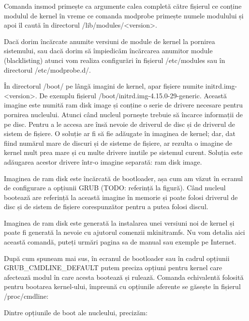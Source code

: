 Comanda insmod primește ca argumente calea completă către fișierul ce conține
modulul de kernel în vreme ce comanda modprobe primește numele modulului și apoi
îl caută în directorul /lib/modules/<version>.

Dacă dorim încărcate anumite versiuni de module de kernel la pornirea
sistemului, sau dacă dorim să împiedicăm încărcarea anumitor module
(blacklisting) atunci vom realiza configurări în fișierul /etc/modules sau în
directorul /etc/modprobe.d/.

În directorul /boot/ pe lângă imagini de kernel, apar fișiere numite
initrd.img-<version>. De exemplu fișierul /boot/initrd.img-4.15.0-29-generic.
Această imagine este numită ram disk image și conține o serie de drivere
necesare pentru pornirea nucleului. Atunci când nucleul pornește trebuie să
încarce informații de pe disc. Pentru a le accesa are însă nevoie de driverul de
disc și de driverul de sistem de fișiere. O soluție ar fi să fie adăugate în
imaginea de kernel; dar, dat fiind numărul mare de discuri și de sisteme de
fișiere, ar rezulta o imagine de kernel mult prea mare și cu multe drivere
inutile pe sistemul curent. Soluția este adăugarea acestor drivere într-o
imagine separată: ram disk image.

Imaginea de ram disk este încărcată de bootloader, așa cum am văzut în ecranul
de configurare a opțiunii GRUB (TODO: referință la figură). Când nucleul
bootează are referință la această imagine în memorie și poate folosi driverul de
disc și de sistem de fișiere corespunzător pentru a putea folosi discul.

Imaginea de ram disk este generată la instalarea unei versiuni noi de kernel și
poate fi generată la nevoie cu ajutorul comenzii mkinitramfs. Nu vom detalia
aici această comandă, puteți urmări pagina sa de manual sau exemple pe Internet.

După cum spuneam mai sus, în ecranul de bootloader sau în cadrul opțiunii
GRUB_CMDLINE_DEFAULT putem preciza opțiuni pentru kernel care afectează modul în
care acesta bootează și rulează. Comanda echivalentă folosită pentru bootarea
kernel-ului, împreună cu opțiunile aferente se găsește în fișierul
/proc/cmdline:


Dintre opțiunile de boot ale nucleului, precizăm:

